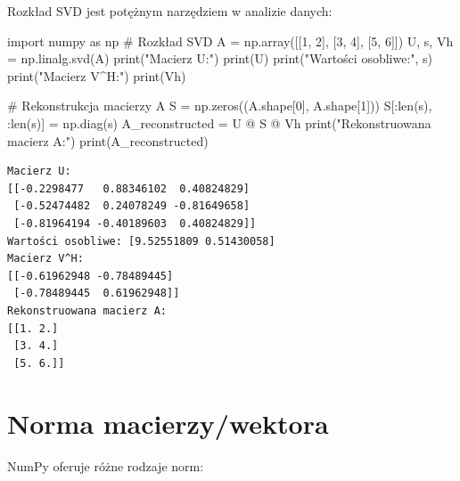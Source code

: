 \documentclass[
  letterpaper,
  DIV=11,
  numbers=noendperiod]{scrreprt}
\newenvironment{Shaded}{\begin{snugshade}}{\end{snugshade}}
\newcommand{\BuiltInTok}[1]{\textcolor[rgb]{0.00,0.23,0.31}{#1}}
\newcommand{\CommentTok}[1]{\textcolor[rgb]{0.37,0.37,0.37}{#1}}
\newcommand{\DecValTok}[1]{\textcolor[rgb]{0.68,0.00,0.00}{#1}}
\newcommand{\ImportTok}[1]{\textcolor[rgb]{0.00,0.46,0.62}{#1}}
\newcommand{\NormalTok}[1]{\textcolor[rgb]{0.00,0.23,0.31}{#1}}
\newcommand{\OperatorTok}[1]{\textcolor[rgb]{0.37,0.37,0.37}{#1}}
\newcommand{\StringTok}[1]{\textcolor[rgb]{0.13,0.47,0.30}{#1}}
\begin{document}
Rozkład SVD jest potężnym narzędziem w analizie danych:

\begin{Shaded}
\begin{Highlighting}[]
\ImportTok{import}\NormalTok{ numpy }\ImportTok{as}\NormalTok{ np}
\CommentTok{\# Rozkład SVD}
\NormalTok{A }\OperatorTok{=}\NormalTok{ np.array([[}\DecValTok{1}\NormalTok{, }\DecValTok{2}\NormalTok{], [}\DecValTok{3}\NormalTok{, }\DecValTok{4}\NormalTok{], [}\DecValTok{5}\NormalTok{, }\DecValTok{6}\NormalTok{]])}
\NormalTok{U, s, Vh }\OperatorTok{=}\NormalTok{ np.linalg.svd(A)}
\BuiltInTok{print}\NormalTok{(}\StringTok{"Macierz U:"}\NormalTok{)}
\BuiltInTok{print}\NormalTok{(U)}
\BuiltInTok{print}\NormalTok{(}\StringTok{"Wartości osobliwe:"}\NormalTok{, s)}
\BuiltInTok{print}\NormalTok{(}\StringTok{"Macierz V\^{}H:"}\NormalTok{)}
\BuiltInTok{print}\NormalTok{(Vh)}

\CommentTok{\# Rekonstrukcja macierzy A}
\NormalTok{S }\OperatorTok{=}\NormalTok{ np.zeros((A.shape[}\DecValTok{0}\NormalTok{], A.shape[}\DecValTok{1}\NormalTok{]))}
\NormalTok{S[:}\BuiltInTok{len}\NormalTok{(s), :}\BuiltInTok{len}\NormalTok{(s)] }\OperatorTok{=}\NormalTok{ np.diag(s)}
\NormalTok{A\_reconstructed }\OperatorTok{=}\NormalTok{ U }\OperatorTok{@}\NormalTok{ S }\OperatorTok{@}\NormalTok{ Vh}
\BuiltInTok{print}\NormalTok{(}\StringTok{"Rekonstruowana macierz A:"}\NormalTok{)}
\BuiltInTok{print}\NormalTok{(A\_reconstructed)}
\end{Highlighting}
\end{Shaded}

\begin{verbatim}
Macierz U:
[[-0.2298477   0.88346102  0.40824829]
 [-0.52474482  0.24078249 -0.81649658]
 [-0.81964194 -0.40189603  0.40824829]]
Wartości osobliwe: [9.52551809 0.51430058]
Macierz V^H:
[[-0.61962948 -0.78489445]
 [-0.78489445  0.61962948]]
Rekonstruowana macierz A:
[[1. 2.]
 [3. 4.]
 [5. 6.]]
\end{verbatim}

\section{Norma macierzy/wektora}\label{norma-macierzywektora}

NumPy oferuje różne rodzaje norm:
\end{document}

